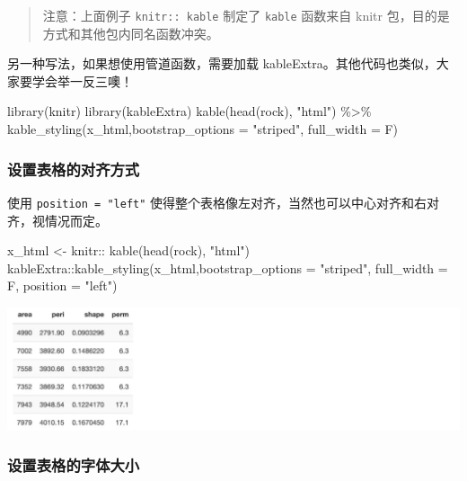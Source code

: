 \documentclass[
]{book}
\newenvironment{Shaded}{\begin{snugshade}}{\end{snugshade}}
\newcommand{\NormalTok}[1]{#1}
\begin{document}
\begin{quote}
注意：上面例子 \texttt{knitr::\ kable} 制定了 \texttt{kable} 函数来自 knitr
包，目的是方式和其他包内同名函数冲突。
\end{quote}

另一种写法，如果想使用管道函数，需要加载
kableExtra。其他代码也类似，大家要学会举一反三噢！

\begin{Shaded}
\begin{Highlighting}[]
\NormalTok{library(knitr)}
\NormalTok{library(kableExtra)}
\NormalTok{kable(head(rock), "html") \%\textgreater{}\% }
\NormalTok{        kable\_styling(x\_html,bootstrap\_options = "striped",}
\NormalTok{                          full\_width = F)}
\end{Highlighting}
\end{Shaded}

\hypertarget{ux8bbeux7f6eux8868ux683cux7684ux5bf9ux9f50ux65b9ux5f0f}{%
\subsubsection{设置表格的对齐方式}\label{ux8bbeux7f6eux8868ux683cux7684ux5bf9ux9f50ux65b9ux5f0f}}

使用 \texttt{position\ =\ "left"}
使得整个表格像左对齐，当然也可以中心对齐和右对齐，视情况而定。

\begin{Shaded}
\begin{Highlighting}[]
\NormalTok{x\_html \textless{}{-} knitr:: kable(head(rock), "html")}
\NormalTok{kableExtra::kable\_styling(x\_html,bootstrap\_options = "striped",}
\NormalTok{                          full\_width = F,}
\NormalTok{                          position = "left")}
\end{Highlighting}
\end{Shaded}

\includegraphics{images/paste-80A658BA.png}

\hypertarget{ux8bbeux7f6eux8868ux683cux7684ux5b57ux4f53ux5927ux5c0f}{%
\subsubsection{设置表格的字体大小}\label{ux8bbeux7f6eux8868ux683cux7684ux5b57ux4f53ux5927ux5c0f}}
\end{document}
